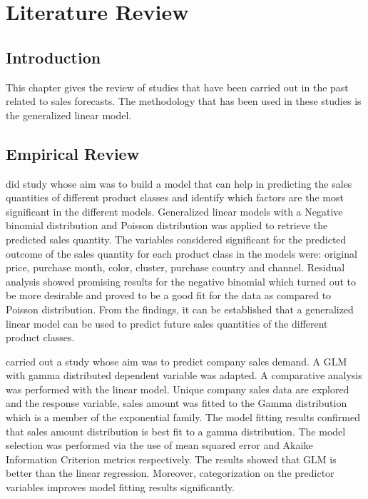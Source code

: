 \chapter{Literature Review} 
\label{Chapter2} 
\section{Introduction}
This chapter gives the review of studies that have been carried out in the past related to sales forecasts. The methodology that has been used in these studies is the generalized linear model.
\section{Empirical Review}
\citet{karlsson2020purchase} did study whose aim was to build a model that can help in  predicting the sales quantities of different product classes and identify which factors are the most significant in the different models. Generalized linear models with a Negative binomial distribution and Poisson distribution was applied to retrieve the predicted sales quantity. The variables considered significant for the predicted outcome of the sales quantity for each product class in the models were: original price, purchase month, color, cluster, purchase country and channel. Residual analysis showed promising results for the negative binomial which turned out to be more desirable  and proved to be a good fit for the data as compared to Poisson distribution. From the findings, it can be established that a generalized linear model can be used to predict future sales quantities of the different product classes.

\citet{article} carried out a study whose aim was to predict company sales demand. A GLM with gamma distributed dependent variable was adapted. A comparative analysis was performed with the linear model. Unique company sales data are explored and the response variable, sales amount was fitted to the Gamma distribution which is a member of the exponential family. The model fitting results confirmed that sales amount distribution is best fit to a gamma distribution. The model selection was performed via the use of mean squared error and Akaike Information Criterion metrics respectively. The results showed that GLM is better than the linear regression. Moreover, categorization on the predictor variables  improves model fitting results significantly.

